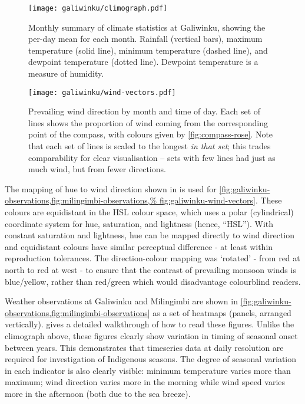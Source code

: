 \begin{figure}[p]
    \centering
    \texttt{[image: galiwinku/climograph.pdf]}
    \caption[Monthly Climograph for Galiwinku]{
        Monthly summary of climate statistics at Galiwinku, showing the per-day
        mean for each month.  Rainfall (vertical bars), maximum temperature
        (solid line), minimum temperature (dashed line), and  dewpoint
        temperature (dotted line).  Dewpoint temperature is a measure of humidity.}
    \label{fig:galiwinku-climograph}
\vspace{1cm}
    \centering
    \texttt{[image: galiwinku/wind-vectors.pdf]}
    \caption[Monthly wind vector summary for Galiwinku]{
        Prevailing wind direction by month and time of day.  Each set of
        lines shows the proportion of wind coming from the corresponding
        point of the compass, with colours given by \cref{fig:compass-rose}.
        Note that each set of lines is scaled to the longest \textit{in
        that set}; this trades comparability for clear visualisation --
        sets with few lines had just as much wind, but from fewer directions.
        }
    \label{fig:galiwinku-wind-vectors}
\end{figure}


The mapping of hue to wind direction shown in  is
used for \cref{fig:galiwinku-observations,fig:milingimbi-observations,%
fig:galiwinku-wind-vectors}.  These colours are equidistant in the HSL colour space,
which uses a polar (cylindrical) coordinate system for hue, saturation,
and lightness (hence, ``HSL'').  With constant saturation and lightness,
hue can be mapped directly to wind direction and equidistant colours
have similar perceptual difference - at least within reproduction tolerances.
%
The direction-colour mapping was `rotated' - from red at north to red at west -
to ensure that the contrast of prevailing monsoon winds is blue/yellow,
rather than red/green which would disadvantage colourblind readers.

Weather observations at Galiwinku and Milingimbi are shown in
\cref{fig:galiwinku-observations,fig:milingimbi-observations} as a set of
heatmaps (panels, arranged vertically).  
gives a detailed walkthrough of how to read these figures.
%
Unlike the climograph above, these figures clearly show variation in timing
of seasonal onset between years.  This demonstrates that timeseries data
at daily resolution are required for investigation of Indigenous seasons.
%
The degree of seasonal variation in each indicator is also clearly visible:
minimum temperature varies more than maximum; wind direction varies more in
the morning while wind speed varies more in the afternoon (both due to the
sea breeze).


